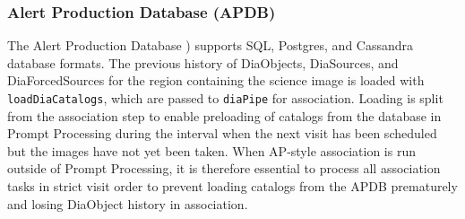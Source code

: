 \subsubsection{Alert Production Database (APDB)}
\label{sec:apdb}

The Alert Production Database \citep[APDB;][]{DMTN-293}) supports SQL, Postgres, and Cassandra database formats.
The previous history of DiaObjects, DiaSources, and DiaForcedSources for the region containing the science image is loaded with \texttt{loadDiaCatalogs}, which are passed to \texttt{diaPipe} for association.
Loading is split from the association step to enable preloading of catalogs from the database in Prompt Processing during the interval when the next visit has been scheduled but the images have not yet been taken.
When AP-style association is run outside of Prompt Processing, it is therefore essential to process all association tasks in strict visit order to prevent loading catalogs from the APDB prematurely and losing DiaObject history in association.
